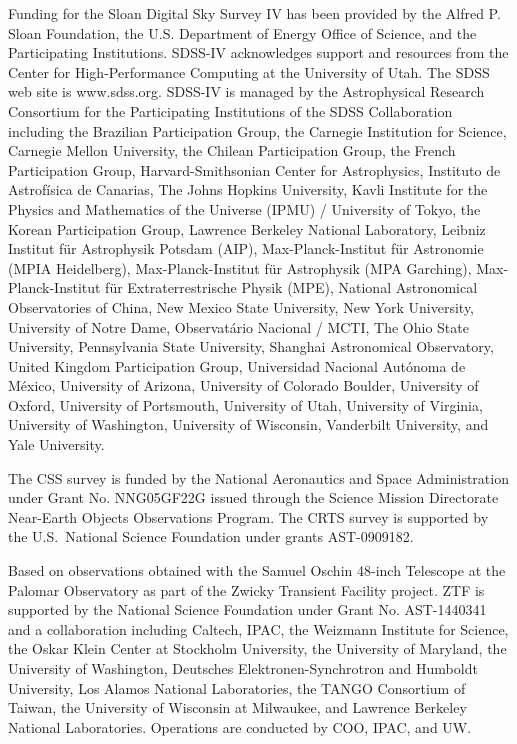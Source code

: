 \documentclass[twocolumn]{aastex62}
\begin{document}
Funding for the Sloan Digital Sky Survey IV has been provided by the Alfred P. Sloan Foundation, the U.S. Department of Energy Office of Science, and the Participating Institutions. SDSS-IV acknowledges
support and resources from the Center for High-Performance Computing at
the University of Utah. The SDSS web site is www.sdss.org.
SDSS-IV is managed by the Astrophysical Research Consortium for the 
Participating Institutions of the SDSS Collaboration including the 
Brazilian Participation Group, the Carnegie Institution for Science, 
Carnegie Mellon University, the Chilean Participation Group, the French Participation Group, Harvard-Smithsonian Center for Astrophysics, 
Instituto de Astrof\'isica de Canarias, The Johns Hopkins University, Kavli Institute for the Physics and Mathematics of the Universe (IPMU) / 
University of Tokyo, the Korean Participation Group, Lawrence Berkeley National Laboratory, 
Leibniz Institut f\"ur Astrophysik Potsdam (AIP),  
Max-Planck-Institut f\"ur Astronomie (MPIA Heidelberg), 
Max-Planck-Institut f\"ur Astrophysik (MPA Garching), 
Max-Planck-Institut f\"ur Extraterrestrische Physik (MPE), 
National Astronomical Observatories of China, New Mexico State University, 
New York University, University of Notre Dame, 
Observat\'ario Nacional / MCTI, The Ohio State University, 
Pennsylvania State University, Shanghai Astronomical Observatory, 
United Kingdom Participation Group,
Universidad Nacional Aut\'onoma de M\'exico, University of Arizona, 
University of Colorado Boulder, University of Oxford, University of Portsmouth, 
University of Utah, University of Virginia, University of Washington, University of Wisconsin, 
Vanderbilt University, and Yale University.

The CSS survey is funded by the National Aeronautics and Space Administration under Grant No. NNG05GF22G issued through the Science Mission Directorate Near-Earth Objects Observations Program.  The CRTS survey is supported by the U.S.~National Science Foundation under grants AST-0909182.


Based on observations obtained with the Samuel Oschin 48-inch Telescope at the Palomar Observatory as part of the Zwicky Transient Facility project. ZTF is supported by the National Science Foundation under Grant No. AST-1440341 and a collaboration including Caltech, IPAC, the Weizmann Institute for Science, the Oskar Klein Center at Stockholm University, the University of Maryland, the University of Washington, Deutsches Elektronen-Synchrotron and Humboldt University, Los Alamos National Laboratories, the TANGO Consortium of Taiwan, the University of Wisconsin at Milwaukee, and Lawrence Berkeley National Laboratories. Operations are conducted by COO, IPAC, and UW.
\end{document}
